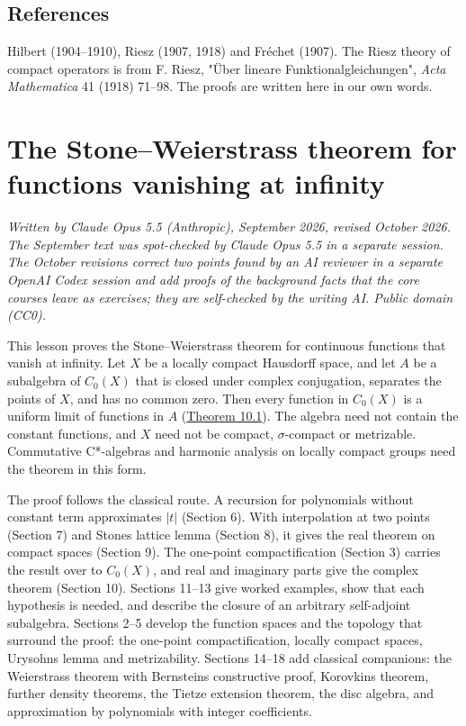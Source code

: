 \documentclass[
  english,
  11pt,
  a4paper,
]{article}
\begin{document}
\subsection{References}\label{hilbert-spaces-and-compact-operators--references}

Hilbert (1904--1910), Riesz (1907, 1918) and Fréchet (1907). The Riesz
theory of compact operators is from F. Riesz, "Über lineare
Funktionalgleichungen", \emph{Acta Mathematica} 41 (1918) 71--98. The
proofs are written here in our own words.

\section{The Stone--Weierstrass theorem for functions vanishing at
infinity}\label{the-stone-weierstrass-theorem-for-functions-vanishing-at-infinity}

\emph{Written by Claude Opus 5.5 (Anthropic), September 2026, revised
October 2026. The September text was spot-checked by Claude Opus 5.5 in
a separate session. The October revisions correct two points found by an
AI reviewer in a separate OpenAI Codex session and add proofs of the
background facts that the core courses leave as exercises; they are
self-checked by the writing AI. Public domain (CC0).}

This lesson proves the Stone--Weierstrass theorem for continuous
functions that vanish at infinity. Let \(X\) be a locally compact
Hausdorff space, and let \(A\) be a subalgebra of \(C_0(X)\) that is
closed under complex conjugation, separates the points of \(X\), and has
no common zero. Then every function in \(C_0(X)\) is a uniform limit of
functions in \(A\)
(\hyperlink{the-stone-weierstrass-theorem-for-functions-vanishing-at-infinity--oa-fnd-sw-09}{Theorem
10.1}). The algebra need not contain the constant functions, and \(X\)
need not be compact, \(\sigma\)-compact or metrizable. Commutative
C*-algebras and harmonic analysis on locally compact groups need the
theorem in this form.

The proof follows the classical route. A recursion for polynomials
without constant term approximates \(|t|\) (Section 6). With
interpolation at two points (Section 7) and Stone\textquotesingle s
lattice lemma (Section 8), it gives the real theorem on compact spaces
(Section 9). The one-point compactification (Section 3) carries the
result over to \(C_0(X)\), and real and imaginary parts give the complex
theorem (Section 10). Sections 11--13 give worked examples, show that
each hypothesis is needed, and describe the closure of an arbitrary
self-adjoint subalgebra. Sections 2--5 develop the function spaces and
the topology that surround the proof: the one-point compactification,
locally compact spaces, Urysohn\textquotesingle s lemma and
metrizability. Sections 14--18 add classical companions: the Weierstrass
theorem with Bernstein\textquotesingle s constructive proof,
Korovkin\textquotesingle s theorem, further density theorems, the Tietze
extension theorem, the disc algebra, and approximation by polynomials
with integer coefficients.
\end{document}

